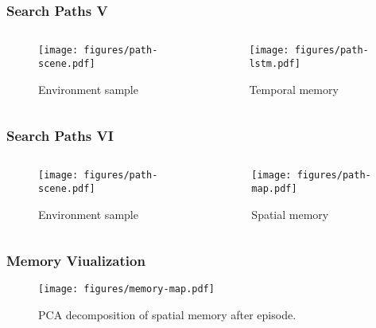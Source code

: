 \begin{frame}
    \frametitle{Search Paths V}

    \begin{columns}
        \begin{column}{0.5\textwidth}
            \begin{figure}
                \centering
                \texttt{[image: figures/path-scene.pdf]}
                \par Environment sample
            \end{figure}
        \end{column}
        \begin{column}{0.5\textwidth}
            \begin{figure}
                \centering
                \texttt{[image: figures/path-lstm.pdf]}
                \par Temporal memory
            \end{figure}
        \end{column}
    \end{columns}
\end{frame}

\begin{frame}
    \frametitle{Search Paths VI}

    \begin{columns}
        \begin{column}{0.5\textwidth}
            \begin{figure}
                \centering
                \texttt{[image: figures/path-scene.pdf]}
                \par Environment sample
            \end{figure}
        \end{column}
        \begin{column}{0.5\textwidth}
            \begin{figure}
                \centering
                \texttt{[image: figures/path-map.pdf]}
                \par Spatial memory 
            \end{figure}
        \end{column}
    \end{columns}
\end{frame}

\begin{frame}
    \frametitle{Memory Viualization}

    \begin{figure}
        \centering
        \texttt{[image: figures/memory-map.pdf]}
        \par PCA decomposition of spatial memory after episode.
    \end{figure}
\end{frame}
